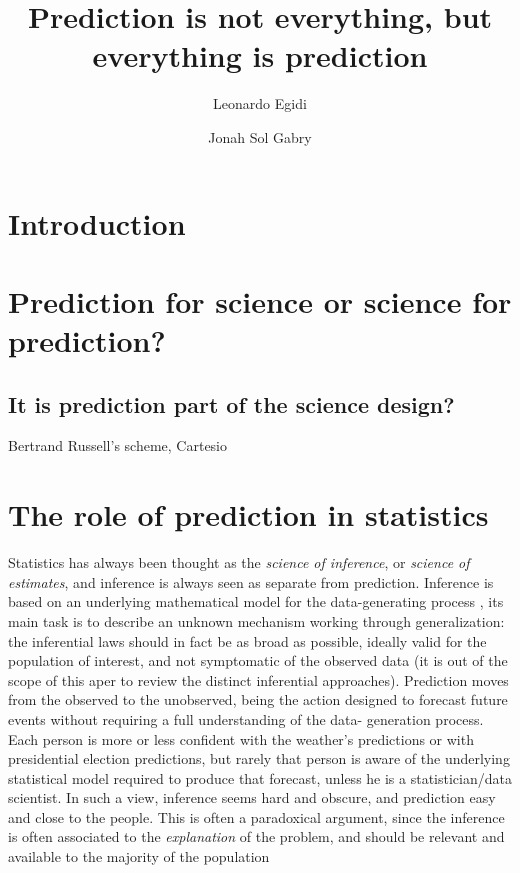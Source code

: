 \documentclass{statsoc}
\title[]{Prediction is not everything, but everything is prediction}
\author[Egidi and Gabry]{Leonardo Egidi}
\author[Egidi and Gabry]{Jonah Sol Gabry}
\begin{document}
\maketitle

\begin{abstract}


\end{abstract}

\section{Introduction}

\section{Prediction for science or science for prediction?}

\subsection{It is prediction part of the science design?}

\color{blue}

Bertrand Russell's scheme, Cartesio

\color{black}

\section{The role of prediction in statistics}

Statistics has always been thought as the \emph{science of inference}, or \emph{science of estimates}, and inference is always seen as separate from prediction. Inference is based on 
an underlying mathematical model for the data-generating process \citep{bzdok2018points}, its main task is to describe an unknown mechanism working through generalization: the 
inferential laws should in fact be as broad as possible, ideally valid for the population of interest, and not symptomatic of the observed data (it is out of the scope of this aper to review the distinct inferential 
approaches). Prediction moves from the observed to the unobserved, being the action designed to forecast future events without requiring a full understanding of the data-
generation process. Each person is more or less confident with the weather's predictions or with presidential election predictions, but rarely that person is aware of the underlying 
statistical model required to produce that forecast, unless he is a statistician/data scientist. In such a view, inference seems hard and obscure, and prediction easy and close 
to the people. This is often a paradoxical argument, since the inference is often associated to the \emph{explanation} of the problem, and should be relevant and available to the majority of the population
\end{document}
